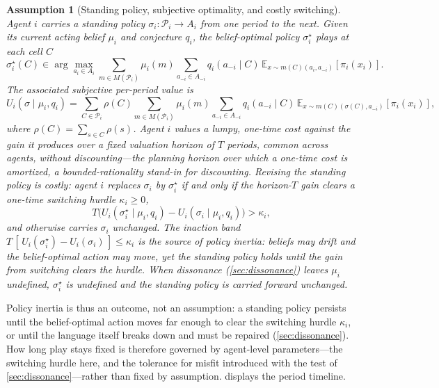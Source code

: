 \documentclass[11pt]{article}
\newtheorem{assumption}{Assumption}[section]
\theoremstyle{definition}
\begin{document}
\begin{assumption}[Standing policy, subjective optimality, and costly switching]
\label{ass:commitment}
Agent $i$ carries a \emph{standing policy} $\sigma_i:\mathcal P_i\to A_i$ from one period to the next.
Given its current acting belief $\mu_i$ and conjecture $q_i$, the \emph{belief-optimal} policy $\sigma_i^{\star}$ plays at each cell $C$
\begin{equation}
\sigma_i^{\star}(C)\in\arg\max_{a_i\in A_i}
\sum_{m\in M(\mathcal P_i)}\mu_i(m)
\sum_{a_{-i}\in A_{-i}}q_i(a_{-i}\mid C)\,
\mathbb E_{x\sim m(C)(a_i,a_{-i})}\!\left[\pi_i(x_i)\right].
\label{eq:subjective-optimality}
\end{equation}
The associated subjective per-period value is
\begin{equation}
U_i(\sigma\mid\mu_i,q_i)=\sum_{C\in\mathcal P_i}\rho(C)\sum_{m\in M(\mathcal P_i)}\mu_i(m)\sum_{a_{-i}\in A_{-i}}q_i(a_{-i}\mid C)\,\mathbb E_{x\sim m(C)(\sigma(C),a_{-i})}\!\left[\pi_i(x_i)\right],
\label{eq:subjective-value}
\end{equation}
where $\rho(C)=\sum_{s\in C}\rho(s)$.
Agent $i$ values a lumpy, one-time cost against the gain it produces over a fixed \emph{valuation horizon} of $T$ periods, common across agents, without discounting---the planning horizon over which a one-time cost is amortized, a bounded-rationality stand-in for discounting.
Revising the standing policy is costly: agent $i$ replaces $\sigma_i$ by $\sigma_i^{\star}$ if and only if the horizon-$T$ gain clears a one-time \emph{switching hurdle} $\kappa_i\ge0$,
\[
T\bigl(U_i(\sigma_i^{\star}\mid\mu_i,q_i)-U_i(\sigma_i\mid\mu_i,q_i)\bigr)>\kappa_i,
\]
and otherwise carries $\sigma_i$ unchanged.
The inaction band $T\,[\,U_i(\sigma_i^{\star})-U_i(\sigma_i)\,]\le\kappa_i$ is the source of policy inertia: beliefs may drift and the belief-optimal action may move, yet the standing policy holds until the gain from switching clears the hurdle.
When dissonance (\cref{sec:dissonance}) leaves $\mu_i$ undefined, $\sigma_i^{\star}$ is undefined and the standing policy is carried forward unchanged.
\end{assumption}

Policy inertia is thus an outcome, not an assumption: a standing policy persists until the belief-optimal action moves far enough to clear the switching hurdle $\kappa_i$, or until the language itself breaks down and must be repaired (\cref{sec:dissonance}).
How long play stays fixed is therefore governed by agent-level parameters---the switching hurdle here, and the tolerance for misfit introduced with the test of \cref{sec:dissonance}---rather than fixed by assumption.
 displays the period timeline.
\end{document}
